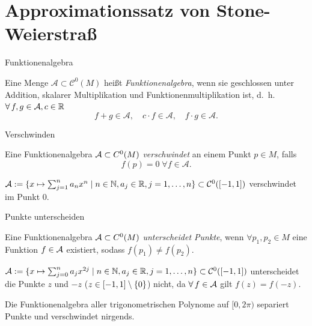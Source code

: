 \section{Approximationssatz von Stone-Weierstraß}

\begin{frame}{Funktionenalgebra}
    \begin{defi}[Funktionenalgebra]
        Eine Menge \( \mathcal{A} \subset \mathcal{C}^0(M) \) heißt 
        \textit{Funktionenalgebra}, wenn sie geschlossen unter Addition, 
        skalarer Multiplikation und Funktionenmultiplikation ist, 
        d.~h. \( \forall f,g \in \A, c \in \mathbb{R} \)
        \[ f + g \in \mathcal{A}, \quad c \cdot f \in \mathcal{A}, \quad f \cdot g \in \mathcal{A}. \]
    \end{defi}
\end{frame}

\begin{frame}{Verschwinden}
    \begin{defi}[Verschwinden]
        Eine Funktionenalgebra \(\mathcal{A} \subset C^0(M)\) 
        \textit{verschwindet} an einem Punkt \(p \in M\), falls 
        \[ f(p) = 0 \;\forall f \in \mathcal{A}. \]
    \end{defi}
    \pause
    \begin{bsp}
        \( \mathcal{A} := \{ x \mapsto \sum_{j=1}^n a_n x^n \;|\; n\in \mathbb{N}, a_j \in \mathbb{R}, j = 1,\ldots, n \} \subset \mathcal{C}^0([-1,1]) \) 
        verschwindet im Punkt \(0\).
    \end{bsp}
\end{frame}

\begin{frame}{Punkte unterscheiden}
    \begin{defi}
        Eine Funktionenalgebra \(\mathcal{A} \subset C^0(M)\) \textit{unterscheidet Punkte}, 
        wenn \( \forall p_1, p_2 \in M \) eine Funktion \(f \in \mathcal{A}\) existiert, 
        sodass \( f(p_1) \neq f(p_2) \).
    \end{defi}
    \pause
    \begin{bsp}
        \( \mathcal{A} := \{ x \mapsto \sum_{j=0}^n a_{j} x^{2j} \;|\; n\in\mathbb{N}, a_j \in \mathbb{R}, j = 1,\ldots, n \} 
        \subset \mathcal{C}^0([-1,1]) \)
        unterscheidet die Punkte \( z \) und \(-z\) (\(z \in [-1,1] \setminus \{0\} \)) nicht, da \( \forall f \in \A \) gilt 
        \( f(z) = f(-z) \).
    \end{bsp}
    \pause
    \begin{bsp}
        Die Funktionenalgebra aller trigonometrischen Polynome auf \( [0,2\pi) \) 
        separiert Punkte und verschwindet nirgends.
    \end{bsp}
\end{frame}

